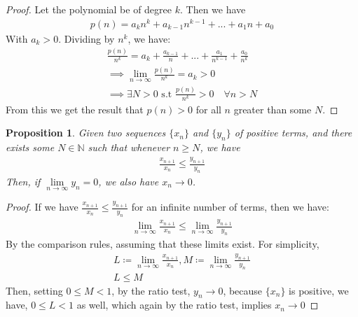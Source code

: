 \documentclass[12pt]{book}
\newtheorem{prop}{Proposition}
\theoremstyle{definition}
\begin{document}
\begin{proof}
Let the polynomial be of degree $k$. Then we have
\begin{align*}
p(n) = a_kn^k + a_{k-1}n^{k-1}+...+a_1n + a_0	
\end{align*}
With $a_k >0$. Dividing by $n^k$, we have:
\begin{align*}
\frac{p(n)}{n^k} = a_k + \frac{a_{k-1}}{n} + ... + \frac{a_1}{n^{k-1}}	+ \frac{a_0}{n^k} \\
\implies \lim_{n \to \infty}\frac{p(n)}{n^k} = a_k > 0\\
\implies \exists N > 0 \text{ s.t } \frac{p(n)}{n^k} > 0 \quad \forall n >N 
\end{align*}
From this we get the result that $p(n)>0$ for all $n$ greater than some $N$. 

\end{proof}
\begin{prop}
Given two sequences $\{x_n\}$ and $\{y_n\}$ of positive terms, and there exists some $N \in \mathbb{N}$ such that whenever $n\geq N$, we have
\begin{align*}
	\frac{x_{n+1}}{x_n} \leq \frac{y_{n+1}}{y_n}
\end{align*}
Then, if $\lim\limits_{n \to \infty} y_n =0$, we also have $x_n \to 0$.
\end{prop}
\begin{proof}
If we have 	$\frac{x_{n+1}}{x_n} \leq \frac{y_{n+1}}{y_n}$ for an infinite number of terms, then we have:
\begin{align*}
\lim_{n \to \infty}\frac{x_{n+1}}{x_n} \leq \lim_{n \to \infty}\frac{y_{n+1}}{y_n}	
\end{align*}
By the comparison rules, assuming that these limits exist. For simplicity,
\begin{gather*}
	L \coloneqq \lim_{n \to \infty}\frac{x_{n+1}}{x_n}, M \coloneqq \lim_{n \to \infty}\frac{y_{n+1}}{y_n}\\
	L \leq M
\end{gather*}
Then, setting $0\leq M <1$, by the ratio test, $y_n \to 0$, because $\{x_n\}$ is positive, we have, $0 \leq L <1 $ as well, which again by the ratio test, implies $x_n \to 0$
  
\end{proof}


\end{document}
